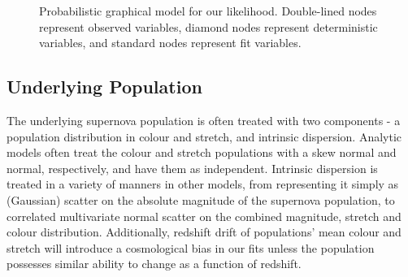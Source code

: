 \documentclass[a4paper,fleqn,usenatbib]{mnras}
\begin{document}
\begin{figure}
\caption{Probabilistic graphical model for our likelihood. Double-lined nodes represent observed variables, diamond nodes represent deterministic variables, and standard nodes represent fit variables.}
\label{fig:pgm}
\end{figure}


\subsection{Underlying Population}

The underlying supernova population is often treated with two components - a population distribution in colour and stretch, and intrinsic dispersion. Analytic models often treat the colour and stretch populations with a skew normal and normal, respectively, and have them as independent. Intrinsic dispersion is treated in a variety of manners in other models, from representing it simply as (Gaussian) scatter on the absolute magnitude of the supernova population, to correlated multivariate normal scatter on the combined magnitude, stretch and colour distribution. Additionally, redshift drift of populations' mean colour and stretch will introduce a cosmological bias in our fits unless the population possesses similar ability to change as a function of redshift. 
\end{document}
